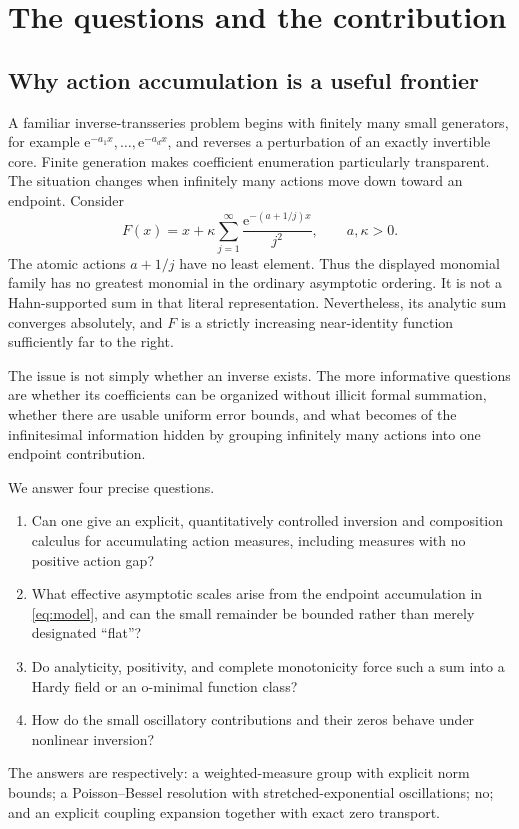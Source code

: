 \documentclass[11pt,a4paper]{article}
\theoremstyle{definition}
\theoremstyle{remark}
\newcommand{\e}{\mathrm e}
\numberwithin{equation}{section}
\begin{document}
\section{The questions and the contribution}\label{sec:overview}

\subsection{Why action accumulation is a useful frontier}
A familiar inverse-transseries problem begins with finitely many small generators, for example $\e^{-a_1x},\ldots,\e^{-a_dx}$, and reverses a perturbation of an exactly invertible core. Finite generation makes coefficient enumeration particularly transparent. The situation changes when infinitely many actions move down toward an endpoint. Consider
\begin{equation}\label{eq:model}
 F(x)=x+\kappa\sum_{j=1}^{\infty}\frac{\e^{-(a+1/j)x}}{j^2},
 \qquad a,\kappa>0.
\end{equation}
The atomic actions $a+1/j$ have no least element. Thus the displayed monomial family has no greatest monomial in the ordinary asymptotic ordering. It is not a Hahn-supported sum in that literal representation. Nevertheless, its analytic sum converges absolutely, and $F$ is a strictly increasing near-identity function sufficiently far to the right.

The issue is not simply whether an inverse exists. The more informative questions are whether its coefficients can be organized without illicit formal summation, whether there are usable uniform error bounds, and what becomes of the infinitesimal information hidden by grouping infinitely many actions into one endpoint contribution.

We answer four precise questions.
\begin{enumerate}[label=\textbf{Q\arabic*.},leftmargin=*]
\item Can one give an explicit, quantitatively controlled inversion and composition calculus for accumulating action measures, including measures with no positive action gap?
\item What effective asymptotic scales arise from the endpoint accumulation in \eqref{eq:model}, and can the small remainder be bounded rather than merely designated ``flat''?
\item Do analyticity, positivity, and complete monotonicity force such a sum into a Hardy field or an o-minimal function class?
\item How do the small oscillatory contributions and their zeros behave under nonlinear inversion?
\end{enumerate}
The answers are respectively: a weighted-measure group with explicit norm bounds; a Poisson--Bessel resolution with stretched-exponential oscillations; no; and an explicit coupling expansion together with exact zero transport.
\end{document}
